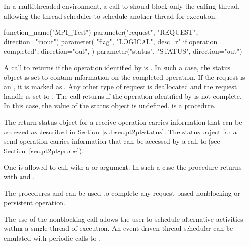 \begin{implementors}
In a multithreaded environment, a call to
 should block only the calling thread, allowing the thread
scheduler to schedule another thread for execution.
\end{implementors}

\begin{mpi-binding}
    function_name("MPI_Test")
    parameter("request", "REQUEST", direction="inout")
    parameter(
        "flag",
        "LOGICAL",
        desc=r" if operation completed",
        direction="out",
    )
    parameter("status", "STATUS", direction="out")
\end{mpi-binding}

A call to  returns  if the
operation identified by  is .  In such a case, the
status object is set to contain information on the completed
operation.  If the request is an  ,
it is marked as .  Any other type of request
is deallocated and the request handle is set to
. The call returns
 if the operation identified by
 is not complete.
In this case, the value
of the status object is undefined.
 is a  procedure.

The return status object for a receive operation carries information that
can be accessed as described in
Section~\ref{subsec:pt2pt-status}.
The status object for a send operation carries information that can be
accessed by
a call to 
(see Section~\ref{sec:pt2pt-probe}).

One
is allowed to call  with a  or  
argument. In such a case the procedure returns with  and
 .

The procedures  and  can be used to
complete any request-based nonblocking or persistent operation.

\begin{users}
The use of
the nonblocking  call allows the user to
schedule alternative activities within a single thread of execution.
An event-driven thread scheduler can be emulated with periodic calls to
.
\end{users}


